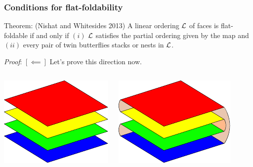 \documentclass{beamer}
\begin{document}

\begin{frame}
\frametitle{Conditions for flat-foldability}

\begin{block}{Theorem: (Nishat and Whitesides 2013)}
A linear ordering $\mathcal{L}$ of faces is flat-foldable if and only if $(i)$ $\mathcal{L}$ satisfies the partial ordering given by the map and $(ii)$ every pair of twin butterflies stacks or nests in $\mathcal{L}$. 
\end{block}

\medskip

\textit{Proof}: $[\impliedby]$ Let's prove this direction now.

\medskip

\begin{columns}[c]

\pause

\includegraphics[width=\textwidth]{sam_images/linear-order-faces.pdf}

\pause

\includegraphics[width=\textwidth]{sam_images/2x2-map-folded.pdf}

\end{columns}

\end{frame}
\end{document}
